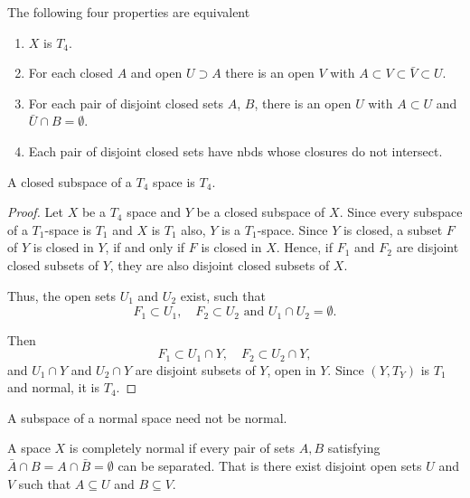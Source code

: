 \documentclass[12pt]{article} %
\begin{document}
\begin{theorem}
    The following four properties are equivalent
    \begin{enumerate}
        \item $X$ is $T_4$.
        \item  For each closed $A$ and open $U \supset A$ there is an open $V$ with $A \subset V \subset \bar{V} \subset U$.
        \item  For each pair of disjoint closed sets $A$, $B$, there is an open $U$ with $A \subset U$ and $\bar{U} \cap B = \emptyset$.
        \item Each pair of disjoint closed sets have nbds whose closures do not intersect.
    \end{enumerate}
\end{theorem}


\begin{theorem}
    A closed subspace of a $T_4$ space is $T_4$.
\end{theorem}
\begin{proof} Let $X$ be a $T_4$ space and $Y$ be a closed subspace of $X$.
    Since every subspace of a $T_1$-space is $T_1$ and $X$ is $T_1$ also, $Y$ is a $T_1$-space. Since $Y$ is closed, a subset $F$ of $Y$ is closed in $Y$, if and only if $F$ is closed in $X$. Hence, if $F_1$ and $F_2$ are disjoint closed subsets of $Y$, they are also disjoint closed subsets of $X$.

Thus, the open sets $U_1$ and $U_2$ exist, such that
\[ F_1 \subset U_1, \quad F_2 \subset U_2 \text{ and } U_1 \cap U_2 = \emptyset. \]

Then
\[ F_1 \subset U_1 \cap Y, \quad F_2 \subset U_2 \cap Y, \]
and $U_1 \cap Y$ and $U_2 \cap Y$ are disjoint subsets of $Y$, open in $Y$. Since $(Y, T_Y)$ is $T_1$ and normal, it is $T_4$.
\end{proof}

\begin{remark}
    A subspace of a normal space need not be normal.
\end{remark}

\begin{definition}
    A space $X$ is completely normal if every pair of sets $A, B$ satisfying $\bar{A} \cap B = A \cap \bar{B}=\emptyset$ can be separated. That is there exist disjoint open sets $U$ and $V$ such that $A \subseteq U$ and $B \subseteq V$.
\end{definition}
\end{document}
